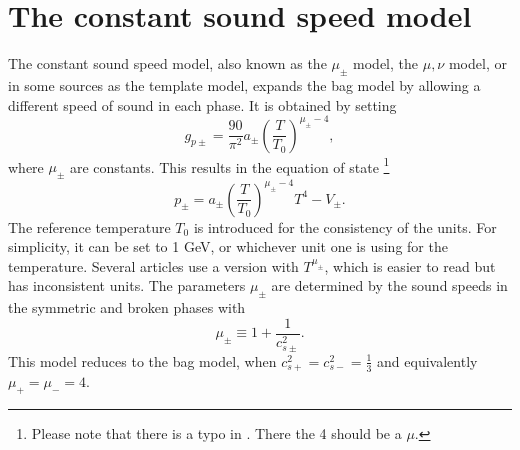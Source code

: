 \section{The constant sound speed model}
\label{const_cs}
The constant sound speed model, also known as the $\mu_\pm$ model, the $\mu, \nu$ model,
or in some sources as the template model,
expands the bag model by allowing a different speed of sound in each phase.
\cites{leitao_hydrodynamics_2015}{giese_2020}{giese_2021}
It is obtained by setting
\begin{equation}
g_{p\pm} = \frac{90}{\pi^2} a_\pm \left( \frac{T}{T_0} \right)^{\mu_\pm - 4},
\end{equation}
where $\mu_\pm$ are constants.
This results in the equation of state
\cites[eq. 15]{giese_2021}[eq. 38]{giese_2020}%
\footnote{Please note that there is a typo in \cite[eq. 15]{giese_2021}. There the 4 should be a $\mu$.}
\begin{equation}
p_\pm = a_\pm \left( \frac{T}{T_0} \right)^{\mu_\pm - 4} T^4 - V_\pm.
\end{equation}
The reference temperature $T_0$ is introduced for the consistency of the units.
For simplicity, it can be set to 1 GeV, or whichever unit one is using for the temperature.
Several articles use a version with $T^{\mu_\pm}$, which is easier to read but has inconsistent units.
The parameters $\mu_\pm$ are determined by the sound speeds in the symmetric and broken phases with
\cites[eq. 16]{giese_2021}[eq. 39]{giese_2020}
\begin{equation}
\mu_\pm \equiv 1 + \frac{1}{c_{s\pm}^2}.
\end{equation}
This model reduces to the bag model,
when $c_{s+}^2 = c_{s-}^2 = \frac{1}{3}$
and equivalently
$\mu_+ = \mu_- = 4$.

